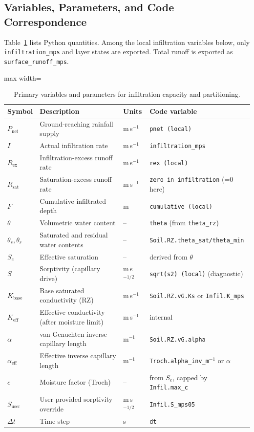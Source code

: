 \documentclass[12pt]{article}
\begin{document}
\subsection{Variables, Parameters, and Code Correspondence}
Table~\ref{tab:infiltration_vars} lists Python quantities. Among the local infiltration variables below, only \texttt{infiltration\_mps} and layer states are exported. Total runoff is exported as \texttt{surface\_runoff\_mps}.

\begin{table}[H]
\centering
\caption{Primary variables and parameters for infiltration capacity and partitioning.}
\label{tab:infiltration_vars}
\begin{adjustbox}{max width=\linewidth}\begin{tabular}{llll}
\toprule
Symbol & Description & Units & Code variable \\
\midrule
\(P_{\mathrm{net}}\) & Ground-reaching rainfall supply & m\,s\(^{-1}\) & \texttt{pnet (local)} \\
\(I\) & Actual infiltration rate & m\,s\(^{-1}\) & \texttt{infiltration\_mps} \\
\(R_{\mathrm{ex}}\) & Infiltration-excess runoff rate & m\,s\(^{-1}\) & \texttt{rex (local)} \\
\(R_{\mathrm{sat}}\) & Saturation-excess runoff rate & m\,s\(^{-1}\) & \texttt{zero in infiltration} (=0 here) \\
\(F\) & Cumulative infiltrated depth & m & \texttt{cumulative (local)} \\
\(\theta\) & Volumetric water content & -- & \texttt{theta} (from \texttt{theta\_rz}) \\
\(\theta_s,\theta_r\) & Saturated and residual water contents & -- & \texttt{Soil.RZ.theta\_sat/theta\_min} \\
\(S_e\) & Effective saturation & -- & derived from \(\theta\) \\
\(S\) & Sorptivity (capillary drive) & m\,s\(^{-1/2}\) & \texttt{sqrt(s2) (local)} (diagnostic) \\
\(K_{\mathrm{base}}\) & Base saturated conductivity (RZ) & m\,s\(^{-1}\) & \texttt{Soil.RZ.vG.Ks} or \texttt{Infil.K\_mps} \\
\(K_{\mathrm{eff}}\) & Effective conductivity (after moisture limit) & m\,s\(^{-1}\) & internal \\
\(\alpha\) & van Genuchten inverse capillary length & m\(^{-1}\) & \texttt{Soil.RZ.vG.alpha} \\
\(\alpha_{\mathrm{eff}}\) & Effective inverse capillary length & m\(^{-1}\) & \texttt{Troch.alpha\_inv\_m}\({}^{-1}\) or \(\alpha\) \\
\(c\) & Moisture factor (Troch) & -- & from \(S_e\), capped by \texttt{Infil.max\_c} \\
\(S_{\mathrm{user}}\) & User-provided sorptivity override & m\,s\(^{-1/2}\) & \texttt{Infil.S\_mps05} \\
\(\Delta t\) & Time step & s & \texttt{dt} \\
\bottomrule
\end{tabular}\end{adjustbox}
\end{table}
\end{document}
